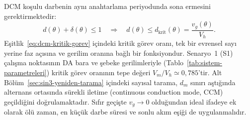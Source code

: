 DCM koşulu darbenin aynı anahtarlama periyodunda sona ermesini gerektirmektedir:
\begin{equation}
  d(\theta)+\delta(\theta)\leq 1
  \quad\Longrightarrow\quad
  d(\theta)\leq d_{\mathrm{krit}}(\theta)=\frac{v_g(\theta)}{V_h}.
  \label{eq:dcm-kritik-gorev}
\end{equation}
Eşitlik~\eqref{eq:dcm-kritik-gorev} içindeki kritik görev oranı, tek bir evrensel sayı yerine faz açısına ve gerilim oranına bağlı bir fonksiyondur. Senaryo~1 (S1) çalışma noktasının DA bara ve şebeke gerilimleriyle (Tablo~\ref{tab:sistem-parametreleri}) kritik görev oranının tepe değeri $V_m/V_h\simeq0{,}785$'tir. Alt Bölüm~\ref{sec:sin3-yeniden-tarama} içindeki sayısal tarama, $d_m$ sınırı aştığında alternans ortasında sürekli iletime (continuous conduction mode, CCM) geçildiğini doğrulamaktadır. Sıfır geçişte $v_g\rightarrow0$ olduğundan ideal ifadeye ek olarak ölü zaman, en küçük darbe süresi ve sonlu akım eşiği de uygulanmalıdır.

